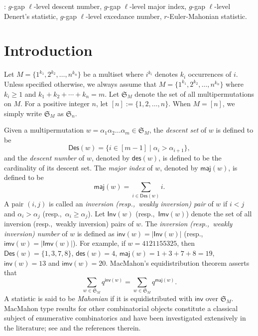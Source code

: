 \documentclass[12pt]{article}
\numberwithin{equation}{section}
\theoremstyle{plain}
\def\des{\mathsf{des}}
\def\maj{\mathsf{maj}}
\def\Inv{\mathsf{Inv}}
\def\Imv{\mathsf{Imv}}
\def\Des{\mathsf{Des}}
\def\inv{\mathsf{inv}}
\def\imv{\mathsf{imv}}
\begin{document}
	
	
	
	:  $g$-gap $\ell$-level descent number,  $g$-gap $\ell$-level major index,  $g$-gap $\ell$-level Denert's statistic, $g$-gap $\ell$-level  excedance number,  $r$-Euler-Mahonian statistic.
	
	
	
	
	
	
	
	
	
	\section{Introduction}
	Let $M=\{1^{k_1}, 2^{k_2}, \ldots, n^{k_n}\}$  be a multiset where $i^{k_i}$ denotes   $k_i$ occurrences of $i$.  Unless specified otherwise, we always assume that $M=\{1^{k_1}, 2^{k_2}, \ldots, n^{k_n}\}$ where $k_i\geq 1$ and $k_1+k_2+\cdots+k_n=m$. Let $\mathfrak{S}_{M}$ denote the set of all multipermutations  on $M$. For a positive integer $n$, let $[n]:=\{1, 2, \ldots, n\}$. When $M=[n]$, we simply write $\mathfrak{S}_{M}$ as $\mathfrak{S}_{n}$.  
	
	 
	Given a multipermutation  $w=\alpha_1 \alpha_2 \ldots \alpha_m\in \mathfrak{S}_{M}$, 
	the  {\em descent set}  of $w$ is defined   to be
	$$
	\Des(w)=\{i\in[m-1]\mid \alpha_i > \alpha_{i+1}\},
	$$
	and 
the  {\em descent number} of $w$, denoted by $\des(w)$,  is defined to be	the cardinality of its descent set. 
 The {\em major index} of $w$, denoted by $\maj(w)$, is defined to be
	$$
	\maj(w)=\sum\limits_{i\in \Des(w) } i.
	$$
	A pair $(i,j)$ is called an {\em inversion (resp.,~weakly inversion) pair} of $w$ if $i<j$ and $\alpha_i>\alpha_j$ (resp.,~$\alpha_i\geq\alpha_j$).  Let $\Inv(w)$ (resp.,~$\Imv(w)$) denote the set of all inversion (resp.,~weakly inversion) pairs of $w$. The  {\em inversion (resp.,~weakly inversion) number} of $w$ is defined as $\inv(w)=|\Inv(w)|$ (resp.,~$\imv(w)=|\Imv(w)|$).    For example, if  $w=4121155325$, then  $\Des(w)=\{1,3,7,8\}$, $\des(w)=4$, $\maj(w)=1+3+7+8=19$, $\inv(w)=13$ and $\imv(w)=20$. MacMahon's equidistribution theorem \cite{Mac} asserts  that  
	\begin{equation}\label{invmaj}
		\sum\limits_{w\in \mathfrak{S}_M}  q^{\inv(w)}=\sum\limits_{w\in \mathfrak{S}_M}q^{\maj(w)}. 
	\end{equation}
 A  statistic  is said to be  {\em Mahonian} if it is  equidistributed  with $\inv$ over $\mathfrak{S}_M$. 
	 MacMahon  type results for  other combinatorial objects constitute a classical subject of enumerative combinatorics and   have been investigated extensively  in the literature;  
	 see \cite{Chen1, Chen2, Liu1, Liu2, RW, Wilson, Yan} and the references therein. 
	
\end{document}
